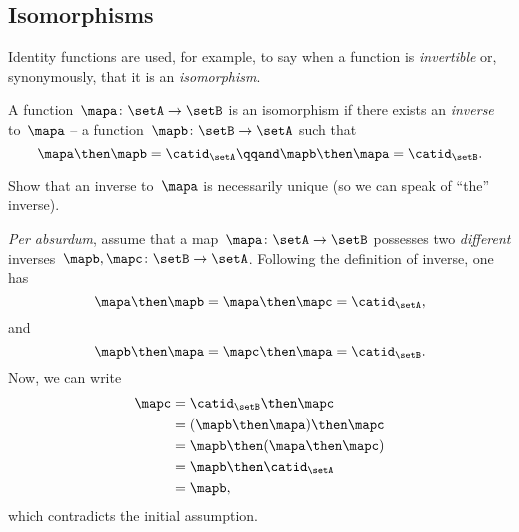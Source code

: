 \subsection{Isomorphisms}

Identity functions are used, for example, to say when a function is \emph{invertible} or, synonymously, that it is an \emph{isomorphism}.

\begin{definition}\label{def:function-isomorphism}
    A function~$\mapa \colon \setA \to \setB$ is an isomorphism if there exists an \emph{inverse} to~$\mapa$ -- a function~$\mapb \colon \setB \to \setA$ such that
    \begin{equation}
        \label{eq:isomorphism-equations}
        \mapa \then \mapb = \catid_\setA
        \qqand
        \mapb \then \mapa = \catid_\setB.
    \end{equation}
\end{definition}

\begin{exercise}
    Show that an inverse to~$\mapa$ is necessarily unique (so we can speak of ``the'' inverse).
\end{exercise}

\begin{solution}
    \emph{Per absurdum}, assume that a map~$\mapa\colon \setA \to \setB$ possesses two \emph{different} inverses~$\mapb,\mapc\colon \setB\to \setA$.
    Following the definition of inverse, one has
    \begin{equation*}
        \mapa \then \mapb=\mapa \then \mapc=\catid_\setA,
    \end{equation*}
    and
    \begin{equation*}
        \mapb \then \mapa=\mapc \then \mapa=\catid_\setB.
    \end{equation*}
    Now, we can write
    \begin{equation*}
        \begin{aligned}
            \mapc & =\catid_\setB \then \mapc \\
                  & =(\mapb \then \mapa)\then \mapc \\
                  & =\mapb\then (\mapa \then \mapc) \\
                  & =\mapb \then \catid_\setA \\
                  & =\mapb,
        \end{aligned}
    \end{equation*}
    which contradicts the initial assumption.
\end{solution}

